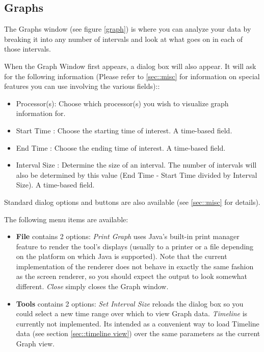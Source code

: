 \documentclass[10pt]{report}
\begin{document}
\subsection{Graphs}
\label{sec::graph view}


The Graphs window (see figure \ref{graph}) is where you can analyze your data by breaking it
into any number of intervals and look at what goes on in each of those
intervals.


When the Graph Window first appears, a dialog box will also appear. It
will ask for the following information (Please refer to
\ref{sec::misc} for information on special features you can
use involving the various fields)::

\begin{itemize}
\item
Processor(s): Choose which processor(s) you wish to visualize graph 
information for.
\item
Start Time : Choose the starting time of interest. A time-based field.
\item
End Time : Choose the ending time of interest. A time-based field.
\item
Interval Size : Determine the size of an interval. The number of intervals
will also be determined by this value (End Time - Start Time divided by
Interval Size). A time-based field.
\end{itemize}

Standard \projections{} dialog options and buttons are also available
(see \ref{sec::misc} for details).

The following menu items are available:

\begin{itemize}
\item
{\bf File} contains 2 options: {\it Print Graph} uses Java's built-in 
print manager feature to render the tool's displays (usually to a printer 
or a file depending on the platform on which Java is supported). Note that
the current implementation of the renderer does not behave in exactly the
same fashion as the screen renderer, so you should expect the output to look
somewhat different. {\it Close} simply closes the Graph window.
\item
{\bf Tools} contains 2 options: {\it Set Interval Size} reloads the dialog
box so you could select a new time range over which to view Graph data.
{\it Timeline} is currently not implemented. Its intended as a convenient
way to load Timeline data (see section \ref{sec::timeline view}) over the 
same parameters as the current Graph view.
\end{itemize}
\end{document}
